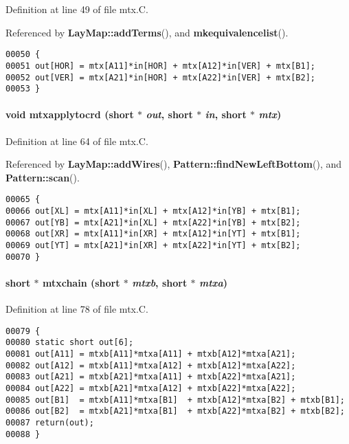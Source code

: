 Definition at line 49 of file mtx.C.

Referenced by {\bf Lay\-Map::add\-Terms}(), and {\bf mkequivalencelist}().\small\begin{verbatim}00050 {
00051 out[HOR] = mtx[A11]*in[HOR] + mtx[A12]*in[VER] + mtx[B1];
00052 out[VER] = mtx[A21]*in[HOR] + mtx[A22]*in[VER] + mtx[B2];
00053 }
\end{verbatim}\normalsize 
\label{mtx.C_a5}
\paragraph{\setlength{\rightskip}{0pt plus 5cm}void mtxapplytocrd (short $\ast$ {\em out}, short $\ast$ {\em in}, short $\ast$ {\em mtx})}\hfill



Definition at line 64 of file mtx.C.

Referenced by {\bf Lay\-Map::add\-Wires}(), {\bf Pattern::find\-New\-Left\-Bottom}(), and {\bf Pattern::scan}().\small\begin{verbatim}00065 {
00066 out[XL] = mtx[A11]*in[XL] + mtx[A12]*in[YB] + mtx[B1];
00067 out[YB] = mtx[A21]*in[XL] + mtx[A22]*in[YB] + mtx[B2];
00068 out[XR] = mtx[A11]*in[XR] + mtx[A12]*in[YT] + mtx[B1];
00069 out[YT] = mtx[A21]*in[XR] + mtx[A22]*in[YT] + mtx[B2];
00070 }
\end{verbatim}\normalsize 
\label{mtx.C_a6}
\paragraph{\setlength{\rightskip}{0pt plus 5cm}short $\ast$ mtxchain (short $\ast$ {\em mtxb}, short $\ast$ {\em mtxa})}\hfill



Definition at line 78 of file mtx.C.\small\begin{verbatim}00079 {
00080 static short out[6];
00081 out[A11] = mtxb[A11]*mtxa[A11] + mtxb[A12]*mtxa[A21];
00082 out[A12] = mtxb[A11]*mtxa[A12] + mtxb[A12]*mtxa[A22];
00083 out[A21] = mtxb[A21]*mtxa[A11] + mtxb[A22]*mtxa[A21];
00084 out[A22] = mtxb[A21]*mtxa[A12] + mtxb[A22]*mtxa[A22];
00085 out[B1]  = mtxb[A11]*mtxa[B1]  + mtxb[A12]*mtxa[B2] + mtxb[B1];
00086 out[B2]  = mtxb[A21]*mtxa[B1]  + mtxb[A22]*mtxa[B2] + mtxb[B2];
00087 return(out);
00088 }
\end{verbatim}\normalsize 
\label{mtx.C_a2}

